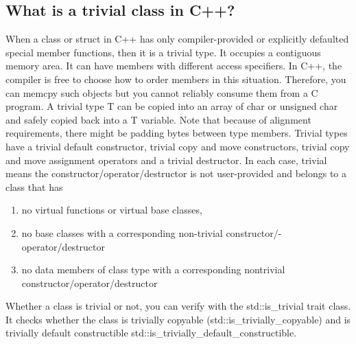\documentclass{report}
\begin{document}
\subsection{ What is a trivial class in C++?}
\bigbreak \noindent 
When a class or struct in C++ has only compiler-provided or
explicitly defaulted special member functions, then it is a trivial
type. It occupies a contiguous memory area. It can have members
with different access specifiers. In C++, the compiler is free to
choose how to order members in this situation. Therefore, you can
memcpy such objects but you cannot reliably consume them from a
C program. A trivial type T can be copied into an array of char or
unsigned char and safely copied back into a T variable. Note that
because of alignment requirements, there might be padding bytes
between type members.
\bigbreak \noindent 
Trivial types have a trivial default constructor, trivial copy and
move constructors, trivial copy and move assignment operators and
a trivial destructor. In each case, trivial means the constructor/operator/destructor is not user-provided and belongs to a class that
has
\begin{enumerate}
    \item no virtual functions or virtual base classes,
    \item no base classes with a corresponding non-trivial constructor/- operator/destructor
    \item no data members of class type with a corresponding nontrivial constructor/operator/destructor
\end{enumerate}
\bigbreak \noindent 
Whether a class is trivial or not, you can verify with the std::is\_trivial trait class. It checks whether the class is trivially copyable
(std::is\_trivially\_copyable) and is trivially default constructible
std::is\_trivially\_default\_constructible.

\pagebreak 
{}
\bigbreak \noindent 
\end{document}
